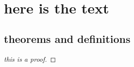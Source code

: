 \section{here is the text}

    \lipsum[3-4]

\subsection{theorems and definitions}
    \lipsum[5-6]

   

    \begin{definition}
        \lipsum[1-2]    
    \end{definition}
    \begin{proposition}
        \lipsum[1-2] 
    \end{proposition}
    \begin{example}
        \lipsum[1-2] 
    \end{example}
    \begin{theorem}
        \lipsum[1-2] 
    \end{theorem}
    \begin{corollary}
        \lipsum[1-2] 
    \end{corollary}
    \begin{exercise}
        \lipsum[1-2]
    \end{exercise}
    \begin{remark}
        \lipsum[1-2]
    \end{remark}
    \begin{proof}[this is a proof]
        \lipsum[1-2]
    \end{proof}
    \begin{lemma}
        \lipsum[1-2]
    \end{lemma}

    \lipsum[100-200] %
